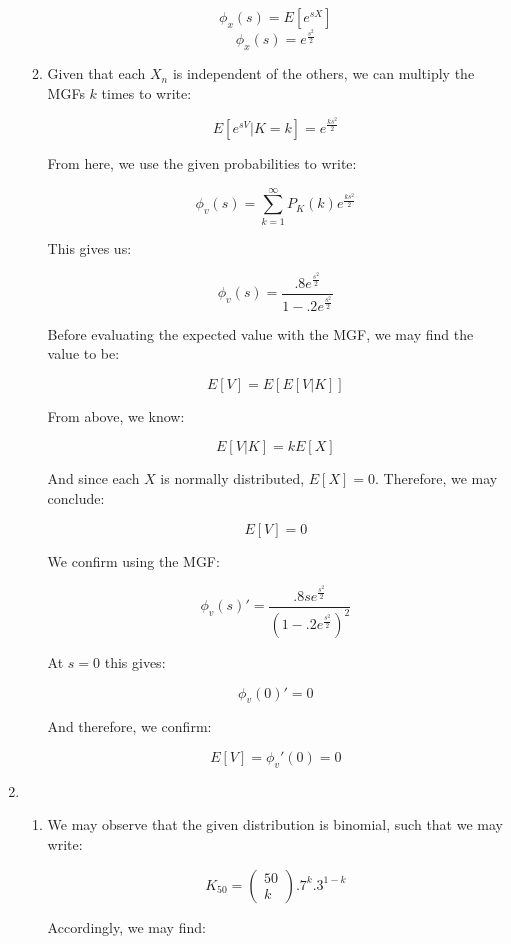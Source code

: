 \begin{enumerate}
\begin{enumerate}
        $$\phi_x(s)=E[e^{sX}]$$
        $$\boxed{\phi_x(s)=e^{\frac{s^2}{2}}}$$

      \item Given that each $X_n$ is independent of the others, we can multiply the MGFs $k$ times to write:

        $$E[e^{sV}|K=k]=e^{\frac{ks^2}{2}}$$

        From here, we use the given probabilities to write:

        $$\phi_v(s)=\sum_{k=1}^{\infty} P_K(k)e^{\frac{ks^2}{2}}$$

        This gives us:

        $$\boxed{\phi_v(s)=\frac{.8e^{\frac{s^2}{2}}}{1-.2e^{\frac{s^2}{2}}}}$$

        Before evaluating the expected value with the MGF, we may find the value to be:

        $$E[V]=E[E[V|K]]$$

        From above, we know:

        $$E[V|K]=kE[X]$$

        And since each $X$ is normally distributed, $E[X]=0$. Therefore, we may conclude:

        $$\boxed{E[V]=0}$$

        We confirm using the MGF:

        $$\phi_v(s)'=\frac{.8se^{\frac{s^2}{2}}}{\left( 1-.2e^{\frac{s^2}{2}} \right)^2}$$

        At $s=0$ this gives:

        $$\phi_v(0)'=0$$

        And therefore, we confirm:

        $$\boxed{E[V]=\phi_v'(0)=0}$$

    \end{enumerate}

  \item

    \begin{enumerate}

      \item We may observe that the given distribution is binomial, such that we may write:

        $$K_{50}=\left( \begin{matrix} 50\\ k \end{matrix} \right).7^k.3^{1-k}$$

        Accordingly, we may find:


\end{enumerate}
\end{enumerate}
